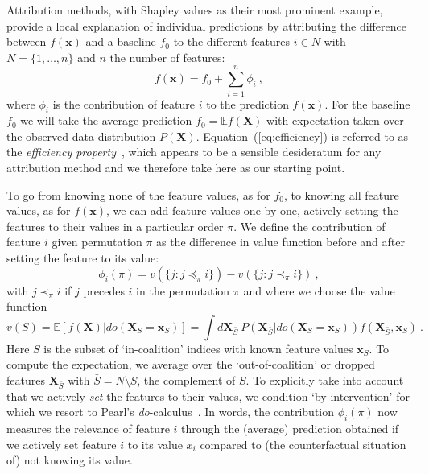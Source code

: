 \documentclass{article}
\newcommand{\vX}{\mathbf{X}}
\newcommand{\vx}{\mathbf{x}}
\newcommand{\expectation}{\mathbb{E}}
\newcommand{\contribution}{{\phi}}
\newcommand{\val}{{v}}
\newcommand{\dodo}{\mathit{do}}
\newcommand{\lvdo}[1]{\dodo(\vX_{#1} = \vx_{#1})}
\newcommand{\perm}{\pi}
\newcommand{\allfeatures}{{N}}
\begin{document}
Attribution methods, with Shapley values as their most prominent example, provide a local explanation of individual predictions by attributing the difference between $f(\vx)$ and a baseline $f_0$ to the different features $i \in \allfeatures$ with $\allfeatures = \{1,\ldots,n\}$ and $n$ the number of features:
\begin{equation}
f(\vx) = f_0 + \sum_{i=1}^n \contribution_i \: ,
\label{eq:efficiency}
\end{equation}
where $\contribution_i$ is the contribution of feature $i$ to the prediction $f(\vx)$. For the baseline $f_0$ we will take the average prediction $f_0 = \expectation f(\vX)$ with expectation taken over the observed data distribution $P(\vX)$. Equation~(\ref{eq:efficiency}) is referred to as the {\em efficiency property}~\cite{shapley1953value}, which appears to be a sensible desideratum for any attribution method and we therefore take here as our starting point.

To go from knowing none of the feature values, as for $f_0$, to knowing all feature values, as for $f(\vx)$, we can add feature values one by one, actively setting the features to their values in a particular order $\perm$. We define the contribution of feature $i$ given permutation $\perm$ as the difference in value function before and after setting the feature to its value:
\begin{equation}
\contribution_i(\perm) = \val(\{j: j \preceq_\perm i\}) - \val(\{j: j \prec_\perm i\}) \: ,
\label{eq:contperm}
\end{equation}
with $j \prec_\perm i$ if $j$ precedes $i$ in the permutation $\perm$
and where we choose the value function
\begin{equation}
\val(S) = \expectation \left[f(\vX) | \lvdo{S} \right] = \int d\vX_{\bar{S}} \: P(\vX_{\bar{S}}|\lvdo{S}) f(\vX_{\bar{S}},\vx_S) \: .
\label{eq:valuedef}
\end{equation}
Here $S$ is the subset of `in-coalition' indices with known feature values $\vx_S$. To compute the expectation, we average over the `out-of-coalition' or dropped features $\vX_{\bar{S}}$ with $\bar{S} = \allfeatures \setminus S$, the complement of $S$. To explicitly take into account that we actively {\em set} the features to their values, we condition `by intervention' for which we resort to Pearl's \textit{do}-calculus~\cite{pearl1995causal}. In words, the contribution $\contribution_i(\perm)$ now measures the relevance of feature $i$ through the (average) prediction obtained if we actively set feature $i$ to its value $x_i$ compared to (the counterfactual situation of) not knowing its value.
\end{document}
